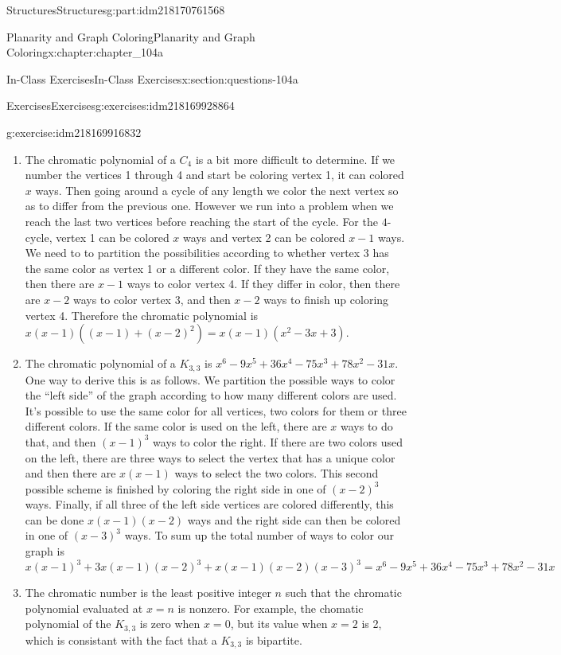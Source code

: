 \documentclass[oneside,10pt,]{book}
\numberwithin{equation}{section}
\begin{document}
\begin{partptx}{Structures}{}{Structures}{}{}{g:part:idm218170761568}
\begin{chapterptx}{Planarity and Graph Coloring}{}{Planarity and Graph Coloring}{}{}{x:chapter:chapter_104a}
\begin{sectionptx}{In-Class Exercises}{}{In-Class Exercises}{}{}{x:section:questions-104a}
\begin{exercises-subsection-numberless}{Exercises}{}{Exercises}{}{}{g:exercises:idm218169928864}
\begin{exercisegroup}
\begin{divisionexerciseeg}{5}{}{}{g:exercise:idm218169916832}
\begin{enumerate}[label=(\alph*)]
\item{}The chromatic polynomial of a \(C_4\) is a bit more difficult to determine.   If we number the vertices 1 through 4 and start be coloring vertex 1, it can colored \(x\) ways.  Then going around a cycle of any length we color the next vertex so as to differ from the previous one.  However we run into a problem when we reach the last two vertices before reaching the start of the cycle.  For the \(4\)-cycle, vertex 1 can be colored \(x\) ways and vertex 2 can be colored \(x-1\) ways. We need to to partition the possibilities according to whether vertex 3 has the same color as vertex 1 or a different color.  If they have the same color, then there are \(x-1\) ways to color vertex 4.  If they differ in color, then there are \(x-2\) ways to color vertex 3, and then \(x-2\) ways to finish up coloring vertex 4. Therefore the chromatic polynomial is \(x(x-1)((x-1)+(x-2)^2)= x(x-1)(x^2-3x+3)\).%
\item{}The chromatic polynomial of a \(K_{3,3}\) is \(x^6-9 x^5+36 x^4-75 x^3+78 x^2-31 x\). One way to derive this is as follows. We partition the possible ways to color the ``left side'' of the graph according to how many different colors are used.  It's possible to use the same color for all vertices, two colors for them or three different colors.  If the same color is used on the left, there are \(x\) ways to do that, and then \((x-1)^3\) ways to color the right. If there are two colors used on the left, there are three ways to select the vertex that has a unique color and then there are \(x(x-1)\) ways to select the two colors. This second possible scheme is finished by coloring the right side in one of  \((x-2)^3\) ways.  Finally, if all three of the left side vertices are colored differently, this can be done \(x(x-1)(x-2)\) ways and the right side can then be colored in one of \((x-3)^3\) ways.  To sum up the total number of ways to color our graph is%
\begin{equation*}
x (x-1)^3  +3x (x-1) (x-2)^3 + x (x-1) (x-2) (x-3)^3= x^6-9 x^5+36 x^4-75 x^3+78 x^2-31 x
\end{equation*}
%
\item{}The chromatic number is the least positive integer \(n\) such that the chromatic polynomial evaluated at \(x=n\) is nonzero.  For example, the chomatic polynomial of the \(K_{3,3}\) is zero when \(x=0\), but its value when \(x=2\) is 2, which is consistant with the fact that a \(K_{3,3}\) is bipartite.%
\end{enumerate}
%
\end{divisionexerciseeg}%

\end{exercisegroup}
\end{exercises-subsection-numberless}
\end{sectionptx}
\end{chapterptx}
\end{partptx}
\end{document}
